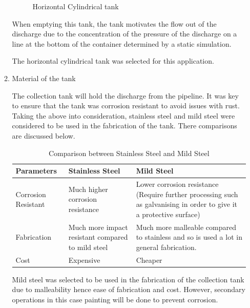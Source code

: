 \begin{itemize}
\begin{enumerate}
\begin{figure}[H]
        \caption{Horizontal Cylindrical tank}
        \label{fig:horizontal_cylindrical_tank}
    \end{figure}
    When emptying this tank, the tank motivates the flow out of the discharge due to the concentration of the pressure of the discharge on a line at the bottom of the container determined by a static simulation.
    \par
    The horizontal cylindrical tank was selected for this application.
    \item Material of the tank
    \par
   The collection tank will hold the discharge from the pipeline. It was key to ensure that the tank was corrosion resistant to avoid issues with rust. Taking the above into consideration, stainless steel and mild steel were considered to be used in the fabrication of the tank. There comparisons are discussed below.
   \begin{table}[H]
    \centering
      \caption[Stainless Steel Versus Mild Steel]{Comparison between Stainless Steel and Mild Steel}
    \begin{tabular}{|m{3cm}|m{5cm}|m{5cm}|}
    \hline
Parameters & Stainless Steel &  Mild Steel \\ \hline 
Corrosion Resistant &  Much higher corrosion resistance &  Lower corrosion resistance (Require further processing such as galvanising in order to give it a protective surface) \\ \hline
Fabrication & Much more impact resistant compared to mild steel  & Much more malleable compared to stainless and so is used a lot in general fabrication.\\ \hline
Cost & Expensive & Cheaper\\ \hline
    \end{tabular}
    \end{table}
 \par
 Mild steel was selected to be used in the fabrication of the collection tank due to malleability hence ease of fabrication and cost. However, secondary operations in this case painting will be done to prevent corrosion.
 

\end{enumerate}
\end{itemize}
